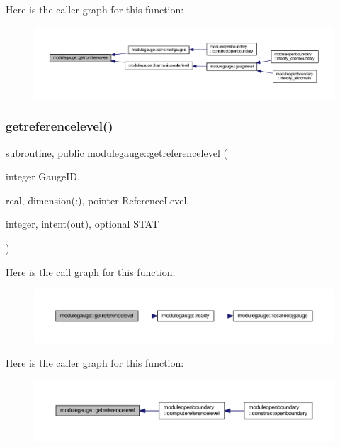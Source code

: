 Here is the caller graph for this function\+:\nopagebreak
\begin{figure}[H]
\begin{center}
\leavevmode
\includegraphics[width=350pt]{namespacemodulegauge_a3e3b74ba912595c577820445ad14cb64_icgraph}
\end{center}
\end{figure}
\mbox{\label{namespacemodulegauge_a3f8df5ad4b3209ed0c1f3dda8945093f}} 
\subsubsection{\texorpdfstring{getreferencelevel()}{getreferencelevel()}}
{\footnotesize\ttfamily subroutine, public modulegauge\+::getreferencelevel (\begin{DoxyParamCaption}\item[{integer}]{Gauge\+ID,  }\item[{real, dimension(\+:), pointer}]{Reference\+Level,  }\item[{integer, intent(out), optional}]{S\+T\+AT }\end{DoxyParamCaption})}

Here is the call graph for this function\+:\nopagebreak
\begin{figure}[H]
\begin{center}
\leavevmode
\includegraphics[width=350pt]{namespacemodulegauge_a3f8df5ad4b3209ed0c1f3dda8945093f_cgraph}
\end{center}
\end{figure}
Here is the caller graph for this function\+:\nopagebreak
\begin{figure}[H]
\begin{center}
\leavevmode
\includegraphics[width=350pt]{namespacemodulegauge_a3f8df5ad4b3209ed0c1f3dda8945093f_icgraph}
\end{center}
\end{figure}
\mbox{\label{namespacemodulegauge_a0912cebda10faa15469d951016b5db0e}} 
